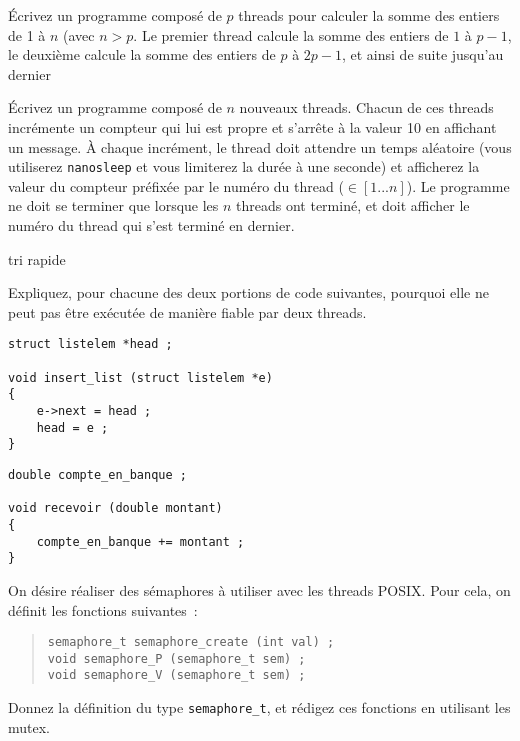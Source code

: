 %


% 

\question	%

Écrivez un programme composé de $p$ threads pour calculer la somme
des entiers de 1 à $n$ (avec $n > p$. Le premier thread calcule la
somme des entiers de $1$ à $p-1$, le deuxième calcule la somme des
entiers de $p$ à $2p-1$, et ainsi de suite jusqu'au dernier 

\question	%

Écrivez un programme composé de $n$ nouveaux threads. Chacun de ces
threads incrémente un compteur qui lui est propre et s'arrête à
la valeur 10 en affichant un message. À chaque incrément, le thread
doit attendre un temps aléatoire (vous utiliserez \texttt {nanosleep}
et vous limiterez la durée à une seconde) et afficherez la valeur
du compteur préfixée par le numéro du thread ($\in [1...n]$). Le
programme ne doit se terminer que lorsque les $n$ threads ont terminé,
et doit afficher le numéro du thread qui s'est terminé en dernier.

\question	%

tri rapide 


\question

Expliquez, pour chacune des deux portions de code suivantes, pourquoi
elle ne peut pas être exécutée de manière fiable par deux threads.

\hfill
\begin {minipage} [t] {0.45\linewidth}
    \small
    \begin {verbatim}
struct listelem *head ;

void insert_list (struct listelem *e)
{
    e->next = head ;
    head = e ;
}
\end{verbatim}
\end {minipage}
\hfill
\begin {minipage} [t] {0.45\linewidth}
    \small
    \begin {verbatim}
double compte_en_banque ;

void recevoir (double montant)
{
    compte_en_banque += montant ;
}
\end{verbatim}
\end {minipage}


\question

On désire réaliser des sémaphores à utiliser avec les threads POSIX.
Pour cela, on définit les fonctions suivantes~:

\begin {quote}
\begin {verbatim}
semaphore_t semaphore_create (int val) ;
void semaphore_P (semaphore_t sem) ;
void semaphore_V (semaphore_t sem) ;
\end{verbatim}
\end {quote}

Donnez la définition du type \verb|semaphore_t|, et rédigez ces fonctions
en utilisant les mutex.
